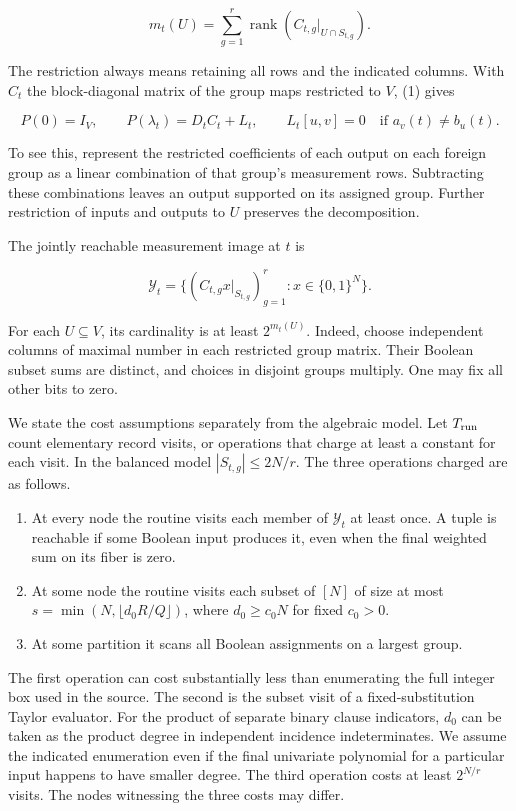 \documentclass[
  10pt,
]{article}
\providecommand{\tightlist}{%
  \setlength{\itemsep}{0pt}\setlength{\parskip}{0pt}}
\begin{document}
\[
 m_t(U)=\sum_{g=1}^{r}\operatorname{rank}\!\left(
                  C_{t,g}|_{U\cap S_{t,g}}\right).
\]

The restriction always means retaining all rows and the indicated
columns. With \(C_t\) the block-diagonal matrix of the group maps
restricted to \(V\), (1) gives

\[
 P(0)=I_V,\qquad P(\lambda_t)=D_t C_t+L_t,\qquad
 L_t[u,v]=0\quad\text{if }a_v(t)\ne b_u(t).                          \tag{2}
\]

To see this, represent the restricted coefficients of each output on
each foreign group as a linear combination of that group's measurement
rows. Subtracting these combinations leaves an output supported on its
assigned group. Further restriction of inputs and outputs to \(U\)
preserves the decomposition.

The jointly reachable measurement image at \(t\) is

\[
  \mathcal Y_t=\{(C_{t,g}x|_{S_{t,g}})_{g=1}^{r}:x\in\{0,1\}^N\}.
\]

For each \(U\subseteq V\), its cardinality is at least \(2^{m_t(U)}\).
Indeed, choose independent columns of maximal number in each restricted
group matrix. Their Boolean subset sums are distinct, and choices in
disjoint groups multiply. One may fix all other bits to zero.

We state the cost assumptions separately from the algebraic model. Let
\(T_{\rm run}\) count elementary record visits, or operations that
charge at least a constant for each visit. In the balanced model
\(|S_{t,g}|\le2N/r\). The three operations charged are as follows.

\begin{enumerate}
\def\labelenumi{\arabic{enumi}.}
\tightlist
\item
  At every node the routine visits each member of \(\mathcal Y_t\) at
  least once. A tuple is reachable if some Boolean input produces it,
  even when the final weighted sum on its fiber is zero.
\item
  At some node the routine visits each subset of \([N]\) of size at most
  \(s=\min(N,\lfloor d_0R/Q\rfloor)\), where \(d_0\ge c_0N\) for fixed
  \(c_0>0\).
\item
  At some partition it scans all Boolean assignments on a largest group.
\end{enumerate}

The first operation can cost substantially less than enumerating the
full integer box used in the source. The second is the subset visit of a
fixed-substitution Taylor evaluator. For the product of separate binary
clause indicators, \(d_0\) can be taken as the product degree in
independent incidence indeterminates. We assume the indicated
enumeration even if the final univariate polynomial for a particular
input happens to have smaller degree. The third operation costs at least
\(2^{N/r}\) visits. The nodes witnessing the three costs may differ.
\end{document}
